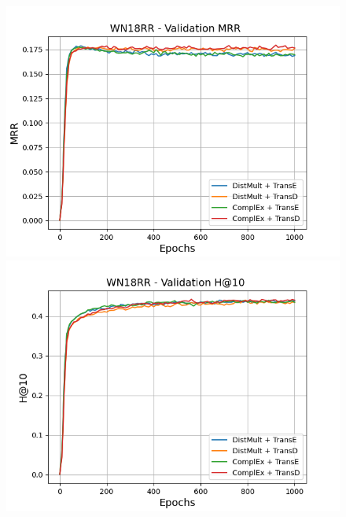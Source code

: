 \begin{figure}[H]
    \centering
    \begin{minipage}{.5\textwidth}
      \centering
      \includegraphics[width=\linewidth]{figures/results/gan_train/not_pretrained/uncertainty/max_distribution/entropy/wn18rr/1k_epochs/uncertainty_wn18rr_mrrs.png}
    \end{minipage}%
    \begin{minipage}{.5\textwidth}
      \centering
      \includegraphics[width=\linewidth]{figures/results/gan_train/not_pretrained/uncertainty/max_distribution/entropy/wn18rr/1k_epochs/uncertainty_wn18rr_hit10.png}
    \end{minipage}
    

\end{figure}

